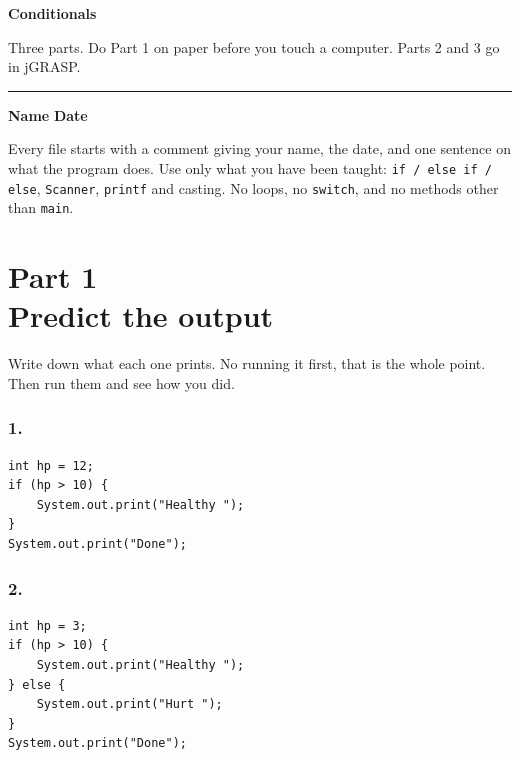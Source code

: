 \documentclass[11pt]{article}
\newcommand{\parttag}[1]{{\sffamily\footnotesize\color{arcane}#1}\\[1pt]}
\newcommand{\code}[1]{\texttt{#1}}
\begin{document}

{\sffamily\bfseries\fontsize{30}{33}\selectfont\color{ink} Conditionals\par}

\vspace{4pt}
{\color{soft}\large Three parts. Do Part 1 on paper before you touch a computer. Parts 2 and 3 go in jGRASP.\par}

\vspace{10pt}
{\color{hair}\rule{\linewidth}{1.2pt}}

\vspace{2pt}
{\sffamily\small\color{soft}\textbf{Name} \underline{\hspace{6.2cm}} \quad \textbf{Date} \underline{\hspace{3.4cm}}}

\vspace{8pt}

Every file starts with a comment giving your name, the date, and one sentence on what the program does. Use only what you have been taught: \code{if / else if / else}, \code{Scanner}, \code{printf} and casting. No loops, no \code{switch}, and no methods other than \code{main}.


\section{\parttag{Part 1}Predict the output}

Write down what each one prints. No running it first, that is the whole point. Then run them and see how you did.

\subsubsection*{1.}
\begin{lstlisting}
int hp = 12;
if (hp > 10) {
    System.out.print("Healthy ");
}
System.out.print("Done");
\end{lstlisting}

\subsubsection*{2.}
\begin{lstlisting}
int hp = 3;
if (hp > 10) {
    System.out.print("Healthy ");
} else {
    System.out.print("Hurt ");
}
System.out.print("Done");
\end{lstlisting}
\end{document}
